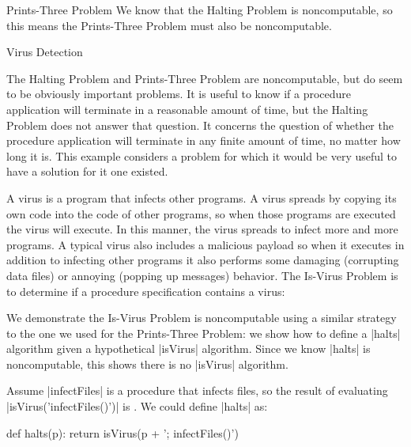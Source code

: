 \begin{schemeregion}
\begin{examplenobar}{Prints-Three Problem}
We know that the Halting Problem is noncomputable, so this means the Prints-Three Problem must also be noncomputable.
\end{examplenobar}

\begin{exploration}{Virus Detection}\vspace*{0.5ex}\par

The Halting Problem and Prints-Three Problem are noncomputable, but do seem to be obviously important problems.  It is useful to know if a procedure application will terminate in a reasonable amount of time, but the Halting Problem does not answer that question.  It concerns the question of whether the procedure application will terminate in any finite amount of time, no matter how long it is.  This example considers a problem for which it would be very useful to have a solution for it one existed.

A virus is a program that infects other programs.  A virus spreads by copying its own code into the code of other programs, so when those programs are executed the virus will execute.  In this manner, the virus spreads to infect more and more programs.  A typical virus also includes a malicious payload so when it executes in addition to infecting other programs it also performs some damaging (corrupting data files) or annoying (popping up messages) behavior.  The Is-Virus Problem is to determine if a procedure specification contains a virus:


We demonstrate the Is-Virus Problem is noncomputable using a similar strategy to the one we used for the Prints-Three Problem: we show how to define a \pycode|halts| algorithm given a hypothetical \pycode|isVirus| algorithm.  Since we know \pycode|halts| is noncomputable, this shows there is no \pycode|isVirus| algorithm.  

Assume \pycode|infectFiles| is a procedure that infects files, so the result of evaluating \pycode|isVirus('infectFiles()')| is \True.  We could define \pycode|halts| as:

\begin{pythoncode}
def halts(p): 
   return isVirus(p + '; infectFiles()')
\end{pythoncode}


\end{exploration}
\end{schemeregion}
